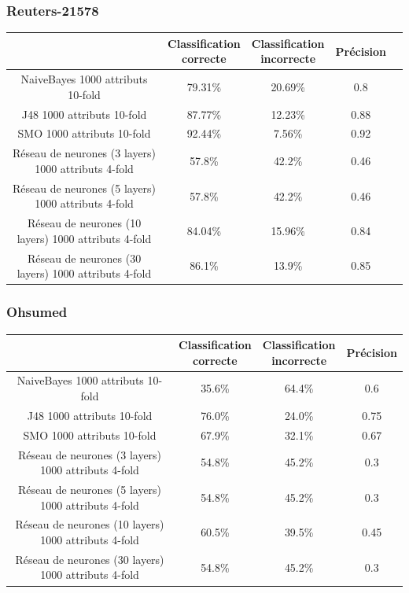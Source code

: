 \documentclass[a4paper,10pt]{article}
\begin{document}
\subsubsection{Reuters-21578}

\begin{center}
\begin{tabular}{ |c|c|c|c|c| } 
 \hline
  & \pbox{20cm}{Classification \\ correcte} &  \pbox{20cm}{Classification \\ incorrecte} & Précision \\ 
 \hline
 NaiveBayes 1000 attributs 10-fold  & 79.31\% & 20.69\% & 0.8\\ 
 J48 1000 attributs 10-fold  & 87.77\% & 12.23\% & 0.88\\ 
 SMO 1000 attributs 10-fold  & 92.44\% & 7.56\% & 0.92\\ 
 Réseau de neurones (3 layers) 1000 attributs 4-fold  & 57.8\% & 42.2\% & 0.46 \\ 
 Réseau de neurones (5 layers) 1000 attributs 4-fold  & 57.8\% & 42.2\% & 0.46\\ 
 Réseau de neurones (10 layers) 1000 attributs 4-fold  & 84.04\% & 15.96\% & 0.84\\ 
 Réseau de neurones (30 layers) 1000 attributs 4-fold  & 86.1\% & 13.9\% & 0.85\\  
 \hline
\end{tabular}
\end{center}

\subsubsection{Ohsumed}

\begin{center}
\begin{tabular}{ |c|c|c|c| } 
 \hline
  & \pbox{20cm}{Classification \\ correcte} &  \pbox{20cm}{Classification \\ incorrecte} & Précision \\ 
 \hline
 NaiveBayes 1000 attributs 10-fold  & 35.6\% & 64.4\% & 0.6 \\ 
 J48 1000 attributs 10-fold  & 76.0\% & 24.0\% & 0.75 \\ 
 SMO 1000 attributs 10-fold  & 67.9\% & 32.1\% & 0.67 \\ 
 Réseau de neurones (3 layers) 1000 attributs 4-fold  & 54.8\% & 45.2\% & 0.3 \\ 
 Réseau de neurones (5 layers) 1000 attributs 4-fold  & 54.8\% & 45.2\% & 0.3 \\ 
 Réseau de neurones (10 layers) 1000 attributs 4-fold  & 60.5\% & 39.5\% & 0.45 \\ 
 Réseau de neurones (30 layers) 1000 attributs 4-fold  & 54.8\% & 45.2\% & 0.3 \\  
 \hline
\end{tabular}
\end{center}
\end{document}

